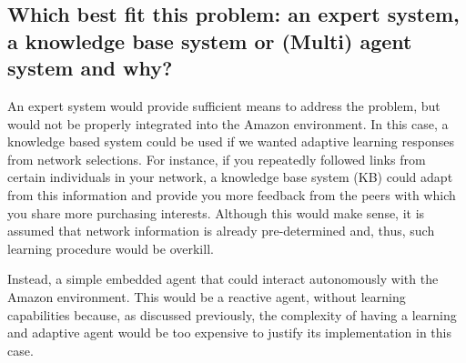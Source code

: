 \documentclass[12pt,a4paper]{article}
\begin{document}
	
	
	\subsection*{Which best fit this problem: an expert system, a knowledge base system or (Multi) agent system and why?}
		An expert system would provide sufficient means to address the problem, but would not be properly integrated into the Amazon environment. In this case, a knowledge based system could be used if we wanted adaptive learning responses from network selections. For instance, if you repeatedly followed links from certain individuals in your network, a knowledge base system (KB) could adapt from this information and provide you more feedback from the peers with which you share more purchasing interests. Although this would make sense, it is assumed that network information is already pre-determined and, thus, such learning procedure would be overkill.
		
		Instead, a simple embedded agent that could interact autonomously with the Amazon environment. This would be a reactive agent, without learning capabilities because, as discussed previously, the complexity of having a learning and adaptive agent would be too expensive to justify its implementation in this case. 
		
\end{document}
